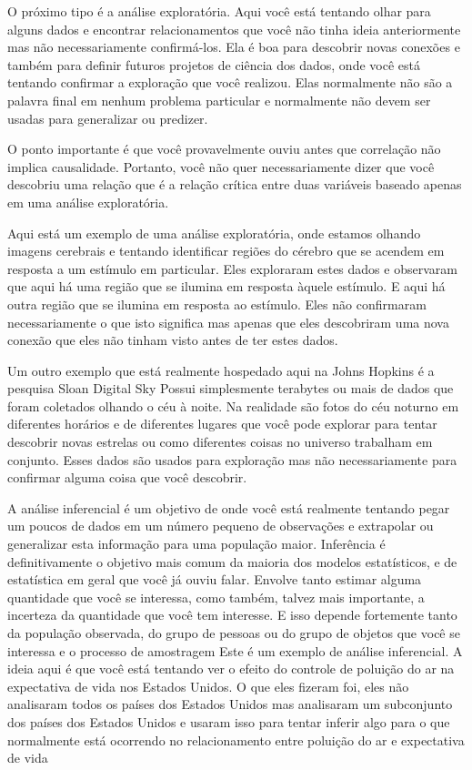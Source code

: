 O próximo tipo é a análise exploratória. Aqui você está tentando olhar para alguns dados e encontrar relacionamentos que você não tinha ideia anteriormente mas não necessariamente confirmá-los. Ela é boa para descobrir novas conexões e também para definir futuros projetos de ciência dos dados, onde você está tentando confirmar a exploração que você realizou. Elas normalmente não são a palavra final em nenhum problema particular e normalmente não devem ser usadas para generalizar ou predizer. 

O ponto importante é que você provavelmente ouviu antes que correlação não implica causalidade. Portanto, você não quer necessariamente dizer que você descobriu uma relação que é a relação crítica entre duas variáveis baseado apenas em uma análise exploratória. 

Aqui está um exemplo  de uma análise exploratória, onde estamos olhando imagens cerebrais e tentando identificar regiões do cérebro que se acendem em resposta a um estímulo em particular. Eles exploraram estes dados e observaram que aqui há uma região que se ilumina em resposta àquele estímulo. E aqui há outra região que se ilumina em resposta ao estímulo. Eles não confirmaram necessariamente o que isto significa mas apenas que eles descobriram uma nova conexão que eles não tinham visto antes de ter estes dados. 

Um outro exemplo que está realmente hospedado aqui na Johns Hopkins é a pesquisa Sloan Digital Sky Possui simplesmente terabytes ou mais de dados que foram coletados olhando o céu à noite. Na realidade são fotos do céu noturno em diferentes horários e de diferentes lugares que você pode explorar para tentar descobrir novas estrelas ou como diferentes coisas no universo trabalham em conjunto. Esses dados são usados para exploração mas não necessariamente para confirmar alguma coisa que você descobrir. 

A análise inferencial é um objetivo de onde você está realmente tentando pegar um poucos de dados em um número pequeno de observações e extrapolar ou generalizar esta informação para uma população maior. Inferência é definitivamente o objetivo mais comum da maioria dos modelos estatísticos, e de estatística em geral que você já ouviu falar. Envolve tanto estimar alguma quantidade que você se interessa, como também, talvez mais importante, a incerteza da quantidade que você tem interesse. E isso depende fortemente tanto da população observada, do grupo de pessoas  ou do grupo de objetos que você se interessa e o processo de amostragem Este é um exemplo de análise inferencial. A ideia aqui é que você está tentando ver o efeito do controle de poluição do ar na expectativa de vida nos Estados Unidos. O que eles fizeram foi, eles não analisaram todos os países dos Estados Unidos mas analisaram um subconjunto dos países dos Estados Unidos e usaram isso para tentar inferir algo para o que normalmente está ocorrendo no relacionamento entre poluição do ar e expectativa de vida 

